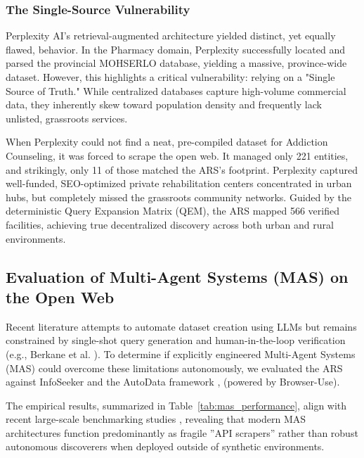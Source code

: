 \documentclass[12pt,oneside]{report}
\begin{document}
\subsubsection{The Single-Source Vulnerability}
Perplexity AI's retrieval-augmented architecture yielded distinct, yet equally flawed, behavior. In the Pharmacy domain, Perplexity successfully located and parsed the provincial MOHSERLO database, yielding a massive, province-wide dataset. However, this highlights a critical vulnerability: relying on a "Single Source of Truth." While centralized databases capture high-volume commercial data, they inherently skew toward population density and frequently lack unlisted, grassroots services. 

When Perplexity could not find a neat, pre-compiled dataset for Addiction Counseling, it was forced to scrape the open web. It managed only 221 entities, and strikingly, only 11 of those matched the ARS's footprint. Perplexity captured well-funded, SEO-optimized private rehabilitation centers concentrated in urban hubs, but completely missed the grassroots community networks. Guided by the deterministic Query Expansion Matrix (QEM), the ARS mapped 566 verified facilities, achieving true decentralized discovery across both urban and rural environments.

\subsection{Evaluation of Multi-Agent Systems (MAS) on the Open Web}
Recent literature attempts to automate dataset creation using LLMs but remains constrained by single-shot query generation and human-in-the-loop verification (e.g., Berkane et al. \cite{69}). To determine if explicitly engineered Multi-Agent Systems (MAS) could overcome these limitations autonomously, we evaluated the ARS against InfoSeeker and the AutoData framework \cite{71}, \cite{72} (powered by Browser-Use). 

The empirical results, summarized in Table~\ref{tab:mas_performance}, align with recent large-scale benchmarking studies \cite{73}, revealing that modern MAS architectures function predominantly as fragile ''API scrapers'' rather than robust autonomous discoverers when deployed outside of synthetic environments.
\end{document}
